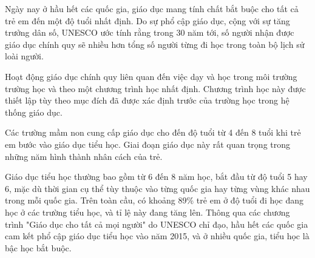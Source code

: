 \documentclass[../thesis.tex]{subfiles}
\begin{document}
Ngày nay ở hầu hết các quốc gia, giáo dục mang tính chất bắt buộc cho tất cả trẻ em đến một độ tuổi nhất định. Do sự phổ cập giáo dục, cộng với sự tăng trưởng dân số, UNESCO ước tính rằng trong 30 năm tới, số người nhận được giáo dục chính quy sẽ nhiều hơn tổng số người từng đi học trong toàn bộ lịch sử loài người.

Hoạt động giáo dục chính quy liên quan đến việc dạy và học trong môi trường trường học và theo một chương trình học nhất định. Chương trình học này được thiết lập tùy theo mục đích đã được xác định trước của trường học trong hệ thống giáo dục.

Các trường mầm non cung cấp giáo dục cho đến độ tuổi từ 4 đến 8 tuổi khi trẻ em bước vào giáo dục tiểu học. Giai đoạn giáo dục này rất quan trọng trong những năm hình thành nhân cách của trẻ.

Giáo dục tiểu học thường bao gồm từ 6 đến 8 năm học, bắt đầu từ độ tuổi 5 hay 6, mặc dù thời gian cụ thể tùy thuộc vào từng quốc gia hay từng vùng khác nhau trong mỗi quốc gia. Trên toàn cầu, có khoảng 89\% trẻ em ở độ tuổi đi học đang học ở các trường tiểu học, và tỉ lệ này đang tăng lên. Thông qua các chương trình "Giáo dục cho tất cả mọi người" do UNESCO chỉ đạo, hầu hết các quốc gia cam kết phổ cập giáo dục tiểu học vào năm 2015, và ở nhiều quốc gia, tiểu học là bậc học bắt buộc.
\end{document}

